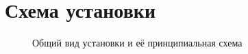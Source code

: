 \section{Схема установки}
\begin{figure}[h]
\begin{minipage}[h]{0.5\linewidth}
\end{minipage}
\begin{minipage}[h]{0.5\linewidth}
\end{minipage}
\caption{Общий вид установки и её принципиальная схема}
\end{figure}